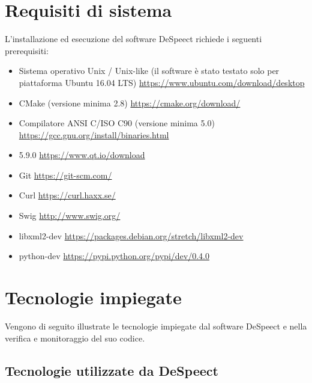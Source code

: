 \documentclass[openany,12pt,a4paper]{report}
\begin{document}
	\chapter{Requisiti di sistema}
	
	L'installazione ed esecuzione del software DeSpeect richiede i seguenti prerequisiti:
	
	\begin{itemize}
		\item Sistema operativo Unix / Unix-like (il software è stato testato solo per piattaforma Ubuntu 16.04 LTS)
			\subitem \url{https://www.ubuntu.com/download/desktop}
		\item CMake (versione minima 2.8)
			\subitem \url{https://cmake.org/download/}
		\item Compilatore ANSI C/ISO C90  (versione minima 5.0)
			\subitem \url{https://gcc.gnu.org/install/binaries.html}
		\item {} 5.9.0
			\subitem \url{https://www.qt.io/download}
		\item Git
			\subitem \url{https://git-scm.com/} 
		\item Curl 
			\subitem \url{https://curl.haxx.se/}
		\item Swig 
			\subitem \url{http://www.swig.org/}
		\item libxml2-dev
			\subitem \url{https://packages.debian.org/stretch/libxml2-dev} 
		\item python-dev
			\subitem \url{https://pypi.python.org/pypi/dev/0.4.0}
	\end{itemize}

	\chapter{Tecnologie impiegate}
	
	Vengono di seguito illustrate le tecnologie impiegate dal software DeSpeect e nella verifica e monitoraggio del suo codice.
	
	\section{Tecnologie utilizzate da DeSpeect}
	
\end{document}
